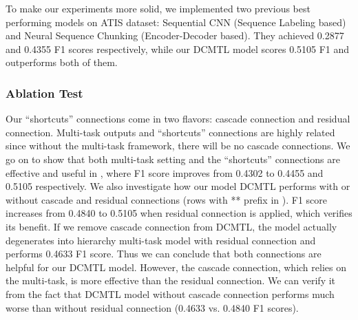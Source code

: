 To make our experiments more solid, 
we implemented two previous best performing models on ATIS dataset: 
Sequential CNN \cite{vu2016sequential} (Sequence Labeling based) and Neural Sequence Chunking \cite{zhai2017neural} (Encoder-Decoder based).
They achieved 0.2877 and 0.4355 F1 scores respectively, while
our DCMTL model scores 0.5105 F1 and outperforms both of them.

\subsubsection{Ablation Test}
Our ``shortcuts'' connections come in two flavors: cascade connection and residual connection.
Multi-task outputs and ``shortcuts'' connections are highly related since without the multi-task framework, there will be no cascade connections.
We go on to show that both multi-task setting and the ``shortcuts'' connections are effective and useful in ,
where F1 score improves from 0.4302 to 0.4455 and 0.5105 respectively.
We also investigate how our model DCMTL performs with or without cascade and residual connections (rows with ** prefix in ).
F1 score increases from 0.4840 to 0.5105 when residual connection is applied, which verifies its benefit.
If we remove cascade connection from DCMTL,
the model actually degenerates into hierarchy multi-task model with residual connection and performs 0.4633 F1 score.
Thus we can conclude that both connections are helpful for our DCMTL model.
However, the cascade connection, which relies on the multi-task, is more effective than the residual connection.
We can verify it from the fact that DCMTL model without cascade connection performs much worse than without residual connection (0.4633 vs. 0.4840 F1 scores).

